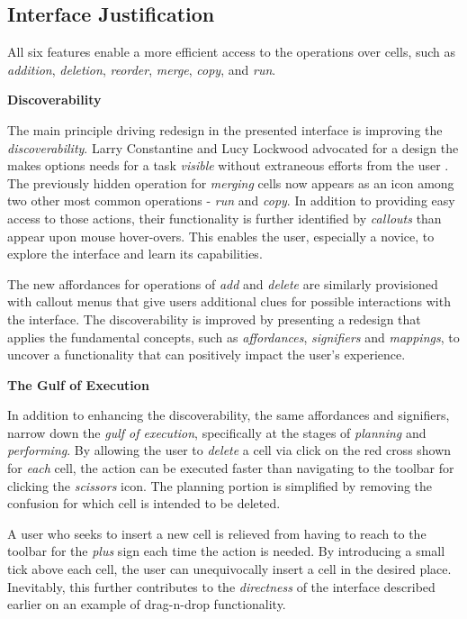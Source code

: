 \documentclass[12pt,letterpaper]{article}
\begin{document}
\subsection*{Interface Justification}
All six features enable a more efficient access to the operations over cells, such as \textit{addition}, \textit{deletion}, \textit{reorder}, \textit{merge}, \textit{copy}, and \textit{run}.

\textbf{Discoverability}

The main principle driving redesign in the presented interface is improving the \textit{discoverability}. Larry Constantine and Lucy Lockwood advocated for a design the makes options needs for a task \textit{visible} without extraneous efforts from the user \cite{jayasimman2011dynamic}. The previously hidden operation for \textit{merging} cells now appears as an icon among two other most common operations - \textit{run} and \textit{copy}. In addition to providing easy access to those actions, their functionality is further identified by \textit{callouts} than appear upon mouse hover-overs. This enables the user, especially a novice, to explore the interface and learn its capabilities. 

The new affordances for operations of \textit{add} and \textit{delete} are similarly provisioned with callout menus that give users additional clues for possible interactions with the interface. The discoverability is improved by presenting a redesign that applies the fundamental concepts, such as \textit{affordances}, \textit{signifiers} and \textit{mappings}, to uncover a functionality that can positively impact the user's experience. 

\textbf{The Gulf of Execution}

In addition to enhancing the discoverability, the same affordances and signifiers, narrow down the \textit{gulf of execution}, specifically at the stages of \textit{planning} and \textit{performing}. By allowing the user to \textit{delete} a cell via click on the red cross shown for \textit{each} cell, the action can be executed faster than navigating to the toolbar for clicking the \textit{scissors} icon. The planning portion is simplified by removing the confusion for which cell is intended to be deleted. 

A user who seeks to insert a new cell is relieved from having to reach to the toolbar for the \textit{plus} sign each time the action is needed. By introducing a small tick above each cell, the user can unequivocally insert a cell in the desired place. Inevitably, this further contributes to the \textit{directness} of the interface described earlier on an example of drag-n-drop functionality. 
\end{document}
